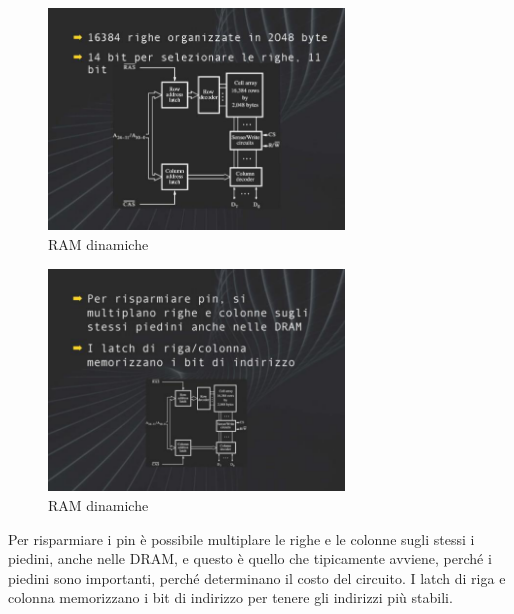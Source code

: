 \FloatBarrier
\begin{figure}[H]
  \centering
  \includegraphics[width=0.70\textwidth,
                    trim=40 30 20 40, %
                    clip]
                    {images/Lez04_p04_fig_05.png}
  \caption{RAM dinamiche}
  \label{fig:Lez04_p04_fig_05}
\end{figure}
\FloatBarrier
\noindent

\FloatBarrier
\begin{figure}[H]
  \centering
  \includegraphics[width=0.70\textwidth,
                    trim=40 30 20 40, %
                    clip]
                    {images/Lez04_p04_fig_06.png}
  \caption{RAM dinamiche}
  \label{fig:Lez04_p04_fig_06}
\end{figure}
\FloatBarrier
\noindent

Per risparmiare i pin è possibile multiplare le righe e le colonne sugli stessi i piedini, anche nelle DRAM, e questo è quello che tipicamente avviene, perché i piedini sono importanti, perché determinano il costo del circuito.
I latch di riga e colonna memorizzano i bit di indirizzo per tenere gli indirizzi più stabili.

